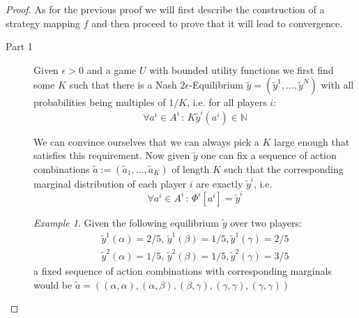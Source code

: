 \documentclass[a4paper]{article}
\theoremstyle{plain}
\theoremstyle{remark}
\newtheorem{remark}{Remark}
\newtheorem{example}{Example}
\begin{document}
\begin{proof}
	As for the previous proof we will first describe the construction of a strategy mapping $f$ and then
	proceed to prove that it will lead to convergence.
	\begin{description}
		\item[Part 1] Given $\epsilon > 0$ and a game $U$ with bounded utility functions we first
		find some $K$ such that there is a Nash $2\epsilon$-Equilibrium $\tilde{y} = (\tilde{y}^1, ..., \tilde{y}^N)$
		with all probabilities being multiples of $1/K$, i.e. for all players $i$:
		\[
			\forall a^i \in A^i \, : \, K\tilde{y}^i(a^i) \in \mathbb{N}
		\]
		
		We can convince ourselves that we can always pick a $K$ large enough that satisfies this requirement.
		Now given $\tilde{y}$ one can fix a sequence of action combinations $\tilde{a} := ( \tilde{a}_1, ..., \tilde{a}_K)$ of length $K$
		such that the corresponding marginal distribution of each player $i$ are exactly $\tilde{y}^i$, i.e.
		\[
			\forall a^i \in A^i \, : \, \Phi^i[a^i] = \tilde{y}^i
		\]
		\begin{example}
			Given the following equilibrium $\tilde{y}$ over two players:
			\begin{gather*}
				\tilde{y}^1(\alpha) = 2/5, \, \tilde{y}^1(\beta) = 1/5, \tilde{y}^1(\gamma) = 2/5\\
				\tilde{y}^2(\alpha) = 1/5, \, \tilde{y}^2(\beta) = 1/5, \tilde{y}^2(\gamma) = 3/5
			\end{gather*}
			a fixed sequence of action combinations with corresponding marginals would be
			$\tilde{a} = ( (\alpha, \alpha), (\alpha, \beta), (\beta, \gamma), (\gamma, \gamma), (\gamma, \gamma) )$
		\end{example}
		
		

\end{description}
\end{proof}
\end{document}
